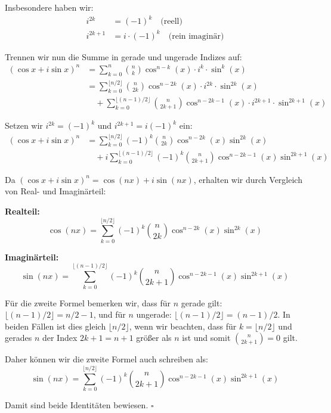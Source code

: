 Insbesondere haben wir:
\begin{align}
  i^{2k} &= (-1)^k \quad \text{(reell)}\\
  i^{2k+1} &= i \cdot (-1)^k \quad \text{(rein imaginär)}
\end{align}

Trennen wir nun die Summe in gerade und ungerade Indizes auf:
\begin{equation}
\begin{split}
(\cos x + i\sin x)^n &= \sum_{k=0}^{n} \binom{n}{k} \cos^{n-k}(x) \cdot i^k \cdot \sin^k(x)\\
&= \sum_{k=0}^{\lfloor n/2 \rfloor} \binom{n}{2k} \cos^{n-2k}(x) \cdot i^{2k} \cdot \sin^{2k}(x)\\
&\quad + \sum_{k=0}^{\lfloor (n-1)/2 \rfloor} \binom{n}{2k+1} \cos^{n-2k-1}(x) \cdot i^{2k+1} \cdot \sin^{2k+1}(x)
\end{split}
\end{equation}

Setzen wir $i^{2k} = (-1)^k$ und $i^{2k+1} = i(-1)^k$ ein:
\begin{equation}
\begin{split}
(\cos x + i\sin x)^n &= \sum_{k=0}^{\lfloor n/2 \rfloor} (-1)^k \binom{n}{2k} \cos^{n-2k}(x) \sin^{2k}(x)\\
&\quad + i \sum_{k=0}^{\lfloor (n-1)/2 \rfloor} (-1)^k \binom{n}{2k+1} \cos^{n-2k-1}(x) \sin^{2k+1}(x)
\end{split}
\end{equation}

Da $(\cos x + i\sin x)^n = \cos(nx) + i\sin(nx)$, erhalten wir durch Vergleich von Real- und Imaginärteil:

\textbf{Realteil:}
\begin{equation}
\cos(nx) = \sum_{k=0}^{\lfloor n/2 \rfloor} (-1)^k \binom{n}{2k} \cos^{n-2k}(x) \sin^{2k}(x)
\end{equation}

\textbf{Imaginärteil:}
\begin{equation}
\sin(nx) = \sum_{k=0}^{\lfloor (n-1)/2 \rfloor} (-1)^k \binom{n}{2k+1} \cos^{n-2k-1}(x) \sin^{2k+1}(x)
\end{equation}

Für die zweite Formel bemerken wir, dass für $n$ gerade gilt: $\lfloor (n-1)/2 \rfloor = n/2 - 1$, und für $n$ ungerade: $\lfloor (n-1)/2 \rfloor = (n-1)/2$. In beiden Fällen ist dies gleich $\lfloor n/2 \rfloor$, wenn wir beachten, dass für $k = \lfloor n/2 \rfloor$ und gerades $n$ der Index $2k+1 = n+1$ größer als $n$ ist und somit $\binom{n}{2k+1} = 0$ gilt.

Daher können wir die zweite Formel auch schreiben als:
\begin{equation}
\sin(nx) = \sum_{k=0}^{\lfloor n/2 \rfloor} (-1)^k \binom{n}{2k+1} \cos^{n-2k-1}(x) \sin^{2k+1}(x)
\end{equation}

Damit sind beide Identitäten bewiesen. $\square$